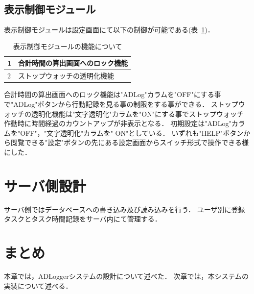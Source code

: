 \subsection{表示制御モジュール}
表示制御モジュールは設定画面にて以下の制御が可能である(表~\ref{tb:hyoji})．
\begin{table}[htb]
\begin{center}
  \begin{tabular}{|l|l|} \hline
   1 & 合計時間の算出画面へのロック機能 \\ \hline
   2 & ストップウォッチの透明化機能 \\ \hline
  \end{tabular}
  \caption{表示制御モジュールの機能について}
  \label{tb:hyoji}
\end{center}
\end{table}
合計時間の算出画面へのロック機能は"ADLog"カラムを"OFF"にする事で"ADLog"ボタンから行動記録を見る事の制限をする事ができる．
ストップウォッチの透明化機能は"文字透明化"カラムを"ON"にする事でストップウォッチ作動時に時間経過のカウントアップが非表示となる．
初期設定は"ADLog"カラムを"OFF"，"文字透明化"カラムを" ON"としている．
いずれも"HELP"ボタンから閲覧できる"設定"ボタンの先にある設定画面からスイッチ形式で操作できる様にした．


\section{サーバ側設計}
サーバ側ではデータベースへの書き込み及び読み込みを行う．
ユーザ別に登録タスクとタスク時間記録をサーバ内にて管理する．

\section{まとめ}
本章では，ADLoggerシステムの設計について述べた．
次章では，本システムの実装について述べる．